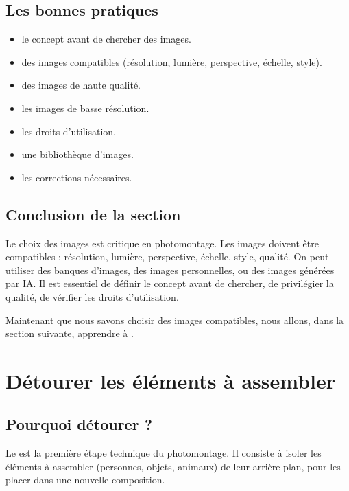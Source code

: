 \subsection{Les bonnes pratiques}

\begin{itemize}
    \item {} le concept avant de chercher des images.
    \item {} des images compatibles (résolution, lumière, perspective, échelle, style).
    \item {} des images de haute qualité.
    \item {} les images de basse résolution.
    \item {} les droits d'utilisation.
    \item {} une bibliothèque d'images.
    \item {} les corrections nécessaires.
\end{itemize}

\subsection*{Conclusion de la section}

Le choix des images est critique en photomontage. Les images doivent être compatibles : résolution, lumière, perspective, échelle, style, qualité. On peut utiliser des banques d'images, des images personnelles, ou des images générées par IA. Il est essentiel de définir le concept avant de chercher, de privilégier la qualité, de vérifier les droits d'utilisation.

Maintenant que nous savons choisir des images compatibles, nous allons, dans la section suivante, apprendre à .

\section{Détourer les éléments à assembler}

\subsection{Pourquoi détourer ?}

Le  est la première étape technique du photomontage. Il consiste à isoler les éléments à assembler (personnes, objets, animaux) de leur arrière-plan, pour les placer dans une nouvelle composition.

